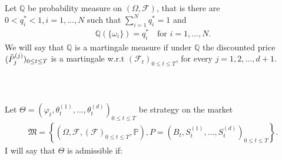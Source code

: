 \documentclass{beamer}
\numberwithin{equation}{section}
\begin{document}
\begin{frame}\frametitle{{\normalsize \secname} \\ {\large \subsecname}}
    \begin{definition}
        Let $\mathbb{Q}$ be probability measure on $(\Omega, \mathscr{F})$, that is there are $0 < q^*_i < 1, i = 1, \ldots, N$ such that $\sum_{i=1}^N q^*_i = 1$ and 
        \begin{align}
            \mathbb{Q}(\{ \omega_i \}) = q^*_i \quad \text{for } i = 1, \ldots, N. 
        \end{align}
        We will say that $\mathbb{Q}$ is a martingale measure if under $\mathbb{Q}$ the discounted price $(\Tilde{P}_j^{(j)})_{0 \leq t \leq T}$ is a martingale w.r.t $(\mathscr{F}_t)_{0 \leq t \leq T}$, for every $j = 1,2, \ldots, d+1$.
    \end{definition}
\end{frame}

\begin{frame}\frametitle{{\normalsize \secname} \\ {\large \subsecname}}
    \begin{definition}
        Let $\Theta = \left(\varphi_t, \theta_t^{(1)}, \ldots, \theta_t^{(d)}\right)_{0 \leq t \leq T}$ be strategy on the market
        \begin{align}
            \mathfrak{M} =
            \left\{
                \left(
                    \Omega, 
                    \mathscr{F}, 
                    \left(
                        \mathscr{F}
                    \right)_{0 \leq t \leq T},
                    \mathbb{P}
                \right),
                P =
                \left(
                    B_t,
                    S_t^{(1)},
                    \ldots,
                    S_t^{(d)}
                \right)_{0 \leq t \leq T}
            \right\}.
        \end{align}
        I will say that $\Theta$ is admissible if:
    \end{definition}
\end{frame}
\end{document}
